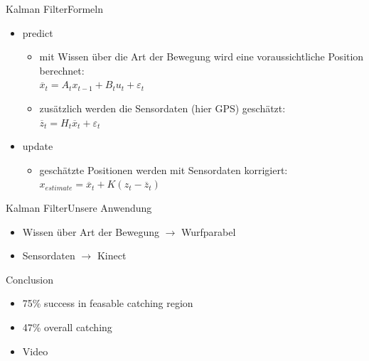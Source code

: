 \documentclass{beamer}
\begin{document}
\begin{frame}{Kalman Filter}{Formeln}
\begin{itemize}
\item<1-> predict
\begin{itemize}
\item<2-> mit Wissen über die Art der Bewegung wird eine voraussichtliche Position berechnet:\\\qquad\qquad$\overline{x}_{t} = A_{t}x_{t-1} + B_{t}u_{t} + \varepsilon_{t}$
\item<2-> zusätzlich werden die Sensordaten (hier GPS) geschätzt:\\\qquad\qquad$\overline{z}_{t} = H_{t}\overline{x}_{t} + \varepsilon_{t}$
\end{itemize}
\item<1-> update
\begin{itemize}
\item<3-> geschätzte Positionen werden mit Sensordaten korrigiert:\\\qquad\qquad$x_{estimate} = \overline{x}_{t} + K(z_{t} - \overline{z}_{t})$
\end{itemize}
\end{itemize}
\end{frame}

\begin{frame}{Kalman Filter}{Unsere Anwendung}
\begin{itemize}
\item Wissen über Art der Bewegung $\rightarrow$ Wurfparabel
\item Sensordaten $\rightarrow$ Kinect
\end{itemize}
\end{frame}

\begin{frame}{Conclusion}
	\begin{itemize}
	\item 75\% success in feasable catching region
	\item 47\% overall catching
	\pause \item Video
	\end{itemize}
	
\end{frame}
\end{document}
